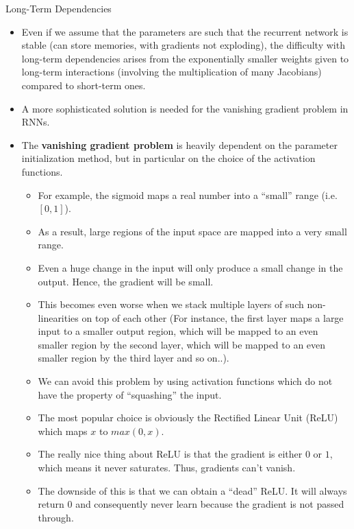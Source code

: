 \begin{vbframe}{Long-Term Dependencies}
  \begin{itemize}
    \item Even if we assume that the parameters are such that the recurrent network is stable (can store memories, with gradients not exploding), the difficulty with long-term dependencies arises from the exponentially smaller weights given to long-term interactions (involving the multiplication of many Jacobians) compared to short-term ones.
    \item A more sophisticated solution is needed for the vanishing gradient problem in RNNs.
    \item The \textbf{vanishing gradient problem} is heavily dependent on the parameter initialization method, but in particular on the choice of the activation functions.
    \begin{itemize}
      \item For example, the sigmoid maps a real number into a \enquote{small} range (i.e. $[0, 1]$).
      \item As a result, large regions of the input space are mapped into a very small range.
      \item Even a huge change in the input will only produce a small change in the output. Hence, the gradient will be small.
      \item This becomes even worse when we stack multiple layers of such non-linearities on top of each other (For instance, the first layer maps a large input to a smaller output region, which will be mapped to an even smaller region by the second layer, which will be mapped to an even smaller region by the third layer and so on..).
      \item We can avoid this problem by using activation functions which do not have the property of \enquote{squashing} the input.
      \item The most popular choice is obviously the Rectified Linear Unit (ReLU) which maps $x$ to $max(0,x)$.
      \item The really nice thing about ReLU is that the gradient is either $0$ or $1$, which means it never saturates. Thus, gradients can't vanish.
      \item The downside of this is that we can obtain a \enquote{dead} ReLU. It will always return $0$  and consequently never learn because the gradient is not passed through.
    \end{itemize}
  \end{itemize}


\end{vbframe}
